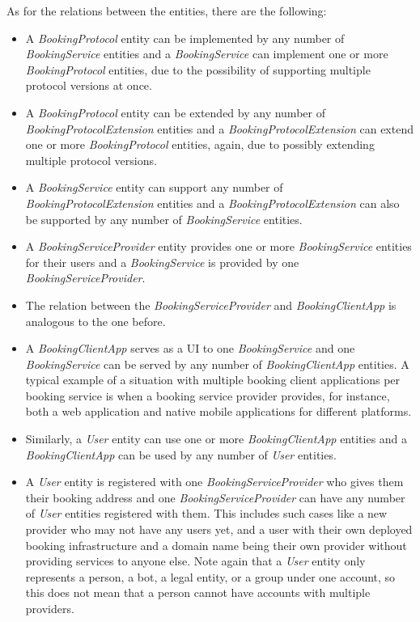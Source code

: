 As for the relations between the entities, there are the following:
\begin{itemize}
    \item A \textit{BookingProtocol} entity can be implemented by any number of \textit{BookingService} entities and a \textit{BookingService} can implement one or more \textit{BookingProtocol} entities, due to the possibility of supporting multiple protocol versions at once.
    \item A \textit{BookingProtocol} entity can be extended by any number of \textit{BookingProtocolExtension} entities and a \textit{BookingProtocolExtension} can extend one or more \textit{BookingProtocol} entities, again, due to possibly extending multiple protocol versions.
    \item A \textit{BookingService} entity can support any number of \textit{BookingProtocolExtension} entities and a \textit{BookingProtocolExtension} can also be supported by any number of \textit{BookingService} entities.
    \item A \textit{BookingServiceProvider} entity provides one or more \textit{BookingService} entities for their users and a \textit{BookingService} is provided by one \textit{BookingServiceProvider}.
    \item The relation between the \textit{BookingServiceProvider} and \textit{BookingClientApp} is analogous to the one before.
    \item A \textit{BookingClientApp} serves as a UI to one \textit{BookingService} and one \textit{BookingService} can be served by any number of \textit{BookingClientApp} entities. A typical example of a situation with multiple booking client applications per booking service is when a booking service provider provides, for instance, both a web application and native mobile applications for different platforms.
    \item Similarly, a \textit{User} entity can use one or more \textit{BookingClientApp} entities and a \textit{BookingClientApp} can be used by any number of \textit{User} entities.
    \item A \textit{User} entity is registered with one \textit{BookingServiceProvider} who gives them their booking address and one \textit{BookingServiceProvider} can have any number of \textit{User} entities registered with them. This includes such cases like a new provider who may not have any users yet, and a user with their own deployed booking infrastructure and a domain name being their own provider without providing services to anyone else. Note again that a \textit{User} entity only represents a person, a bot, a legal entity, or a group under one account, so this does not mean that a person cannot have accounts with multiple providers.

\end{itemize}
